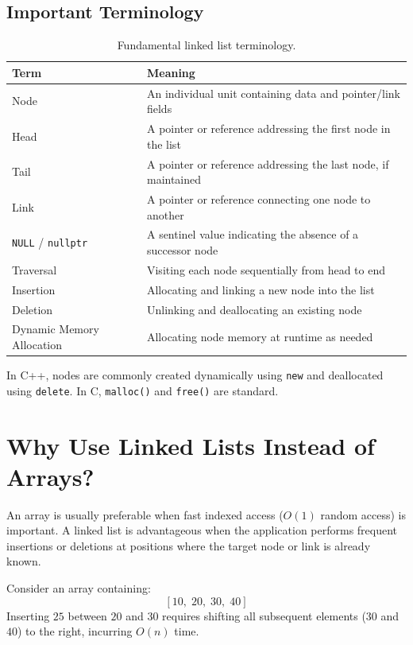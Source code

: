\subsection{Important Terminology}

\begin{table}[htbp]
\centering
\small
\begin{tabularx}{\textwidth}{l X}
\toprule
\textbf{Term} & \textbf{Meaning} \\
\midrule
Node                      & An individual unit containing data and pointer/link fields \\
Head                      & A pointer or reference addressing the first node in the list \\
Tail                      & A pointer or reference addressing the last node, if maintained \\
Link                      & A pointer or reference connecting one node to another \\
\texttt{NULL} / \texttt{nullptr} & A sentinel value indicating the absence of a successor node \\
Traversal                 & Visiting each node sequentially from head to end \\
Insertion                 & Allocating and linking a new node into the list \\
Deletion                  & Unlinking and deallocating an existing node \\
Dynamic Memory Allocation & Allocating node memory at runtime as needed \\
\bottomrule
\end{tabularx}
\caption{Fundamental linked list terminology.}
\end{table}

In C++, nodes are commonly created dynamically using \texttt{new} and deallocated using \texttt{delete}. In C, \texttt{malloc()} and \texttt{free()} are standard.

\section{Why Use Linked Lists Instead of Arrays?}

An array is usually preferable when fast indexed access ($O(1)$ random access) is important. A linked list is advantageous when the application performs frequent insertions or deletions at positions where the target node or link is already known.

Consider an array containing:
\[
[10, \; 20, \; 30, \; 40]
\]
Inserting $25$ between $20$ and $30$ requires shifting all subsequent elements ($30$ and $40$) to the right, incurring $O(n)$ time.

